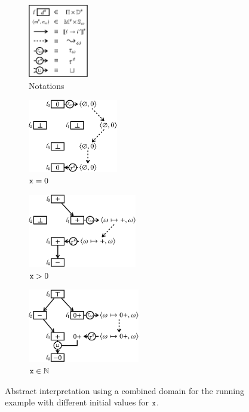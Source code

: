 \begin{figure}[t]
  \centering
  \begin{subfigure}[t]{0.15\textwidth}
    \includegraphics[height=3.2cm]{../img/listing}
    \caption{Notations}
    \label{fig:ds-example1}
  \end{subfigure}
  \quad
  \begin{subfigure}[t]{0.23\textwidth}
    \includegraphics[height=3.2cm]{../img/path-1}
    \caption{$\texttt{x} = 0$}
    \label{fig:ds-example2}
  \end{subfigure}
  \begin{subfigure}[t]{0.28\textwidth}
    \includegraphics[height=3.2cm]{../img/path-2}
    \caption{$\texttt{x} > 0$}
    \label{fig:ds-example3}
  \end{subfigure}
  \begin{subfigure}[t]{0.28\textwidth}
    \includegraphics[height=3.2cm]{../img/path-3}
    \caption{$\texttt{x} \in \mathbb{N}$}
    \label{fig:ds-example4}
  \end{subfigure}
  \caption{Abstract interpretation using a combined domain for the running
  example with different initial values for $\texttt{x}$.}
  \label{fig:ds-examples}
\end{figure}

